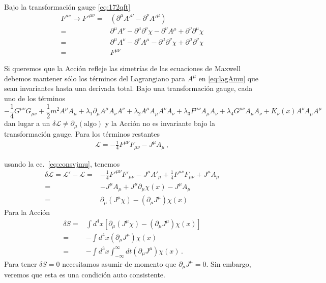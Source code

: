 \begin{frame}
Bajo la transformación gauge \eqref{eq:172qft}
\begin{align}
  \label{eq:fmunutrans}
  F^{\mu\nu}\to{F'}^{\mu\nu}=&(\partial^\mu{A'}^\nu-\partial^\nu{A'}^\mu)\nonumber\\
  =&\partial^\mu A^\nu-\partial^\mu\partial^\nu\chi-\partial^\nu A^\mu+\partial^\nu\partial^\mu\chi\nonumber\\
  =&\partial^\mu A^\nu-\partial^\nu A^\mu-\partial^\mu\partial^\nu\chi+\partial^\mu\partial^\nu\chi\nonumber\\
  =&F^{\mu\nu}
\end{align}

Si queremos que la Acción refleje las simetrías de las ecuaciones de
Maxwell debemos mantener sólo los términos del Lagrangiano para $A^\mu$
en \eqref{eq:lagAmu} que sean invariantes hasta una derivada total. Bajo una transformación gauge, cada
uno de los términos
\begin{equation*}
  -\frac{1}{4}G^{\mu\nu}G_{\mu\nu}+
  \frac{1}{2}m^2A^\mu A_\mu+\lambda_1\partial_\mu A^\mu A_\nu A^\nu+\lambda_2 A^\mu A_\mu A^\nu A_\nu+\lambda_3F^{\mu\nu}A_\mu A_\nu+\lambda_4G^{\mu\nu}A_\mu A_\nu
+K_\nu(x) A^\nu A_\mu A^\mu
\end{equation*}
dan lugar a un $\delta\mathcal{L}\neq\partial_\mu(\text{algo})$ y la Acción no es
invariante bajo la transformación gauge. Para los 
términos restantes
\begin{align}
    \mathcal{L}=-\frac{1}{4}F^{\mu\nu}F_{\mu\nu}-J^\mu A_\mu\,,
\end{align}

 usando la ec.~\eqref{eq:consvjmu}, tenemos
\begin{align}
  \delta\mathcal{L}=\mathcal{L}'-\mathcal{L}=&
-\frac{1}{4}{F'}^{\mu\nu}F'_{\mu\nu}-J^\mu A'_\mu+\frac{1}{4}F^{\mu\nu}F_{\mu\nu}+J^\mu A_\mu\nonumber\\
=&-J^\mu A_\mu+J^\mu\partial_\mu\chi(x)-J^\mu A_\mu\nonumber\\
=&\partial_\mu(J^\mu\chi)-(\partial_\mu J^\mu)\chi(x)
\end{align}
Para la Acción
\begin{align}
  \delta S=&\int d^4x \left[\partial_\mu(J^\mu\chi)-(\partial_\mu J^\mu)\chi(x)\right]\nonumber\\
=&-\int d^4x (\partial_\mu J^\mu)\chi(x)\nonumber\\
=&-\int d^3x\int_{-\infty}^\infty dt (\partial_\mu J^\mu)\chi(x)\,.
\end{align}
Para tener $\delta S=0$ necesitamos asumir de momento que
$\partial_\mu J^\mu=0$. Sin embargo, veremos que esta es una condición
auto consistente.

\end{frame}

